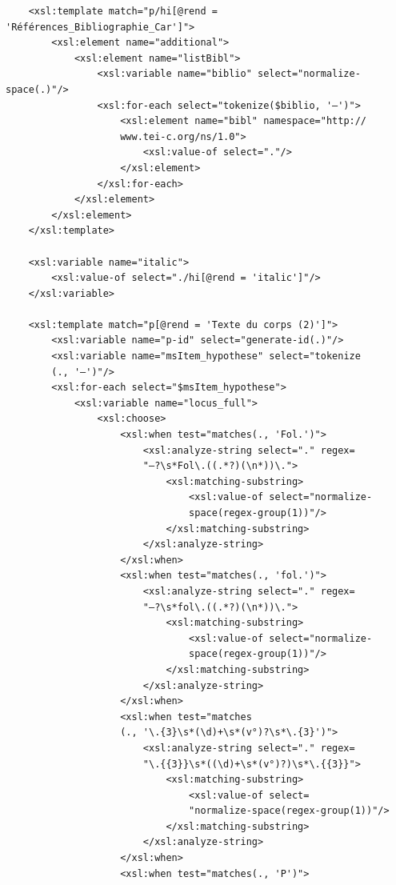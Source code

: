 \documentclass[a4paper,12pt,twoside]{book}
\begin{document}
\begin{verbatim}
    <xsl:template match="p/hi[@rend = 'Références_Bibliographie_Car']">
        <xsl:element name="additional">
            <xsl:element name="listBibl">
                <xsl:variable name="biblio" select="normalize-space(.)"/>
                <xsl:for-each select="tokenize($biblio, '—')">
                    <xsl:element name="bibl" namespace="http://
                    www.tei-c.org/ns/1.0">
                        <xsl:value-of select="."/>
                    </xsl:element>
                </xsl:for-each>
            </xsl:element>
        </xsl:element>
    </xsl:template>
    
    <xsl:variable name="italic">
        <xsl:value-of select="./hi[@rend = 'italic']"/>
    </xsl:variable>

    <xsl:template match="p[@rend = 'Texte du corps (2)']">
        <xsl:variable name="p-id" select="generate-id(.)"/>
        <xsl:variable name="msItem_hypothese" select="tokenize
        (., '—')"/>
        <xsl:for-each select="$msItem_hypothese">
            <xsl:variable name="locus_full">
                <xsl:choose>
                    <xsl:when test="matches(., 'Fol.')">
                        <xsl:analyze-string select="." regex=
                        "—?\s*Fol\.((.*?)(\n*))\.">
                            <xsl:matching-substring>
                                <xsl:value-of select="normalize-
                                space(regex-group(1))"/>
                            </xsl:matching-substring>
                        </xsl:analyze-string>
                    </xsl:when>
                    <xsl:when test="matches(., 'fol.')">
                        <xsl:analyze-string select="." regex=
                        "—?\s*fol\.((.*?)(\n*))\.">
                            <xsl:matching-substring>
                                <xsl:value-of select="normalize-
                                space(regex-group(1))"/>
                            </xsl:matching-substring>
                        </xsl:analyze-string>
                    </xsl:when>
                    <xsl:when test="matches
                    (., '\.{3}\s*(\d)+\s*(v°)?\s*\.{3}')">
                        <xsl:analyze-string select="." regex=
                        "\.{{3}}\s*((\d)+\s*(v°)?)\s*\.{{3}}">
                            <xsl:matching-substring>
                                <xsl:value-of select=
                                "normalize-space(regex-group(1))"/>
                            </xsl:matching-substring>
                        </xsl:analyze-string>
                    </xsl:when>
                    <xsl:when test="matches(., 'P')">                

\end{verbatim}
\end{document}
